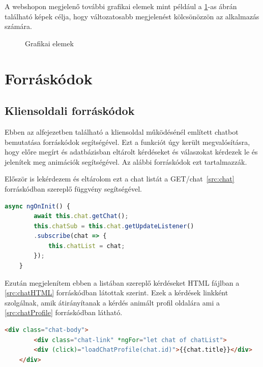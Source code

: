 A webshopon megjelenő további grafikai elemek mint például a \ref{fig.picture-13}-as ábrán található képek célja, hogy változatosabb megjelenést kölcsönözzön az alkalmazás számára.
\begin{figure}[H]
	\centering
	\hspace{5pt}
	\caption{Grafikai elemek}
	\label{fig.picture-13}
\end{figure}

\section{Forráskódok}

\subsection{Kliensoldali forráskódok}
Ebben az alfejezetben található a kliensoldal működésénél említett chatbot bemutatása forráskódok segítségével. Ezt a funkciót úgy került megvalósításra, hogy előre megírt és adatbázisban eltárolt kérdéseket és válaszokat kérdezek le és jelenítek meg animációk segítségével. Az alábbi forráskódok ezt tartalmazzák.

Először is lekérdezem és eltárolom ezt a chat listát a GET/chat~\ref{src:chat} forráskódban szereplő függvény  segítségével.

\begin{lstlisting}[language=JavaScript]
	async ngOnInit() {
		await this.chat.getChat();
		this.chatSub = this.chat.getUpdateListener()
		.subscribe(chat => {
			this.chatList = chat;
		});
	}
\end{lstlisting}

Ezután megjelenítem ebben a listában szereplő kérdéseket HTML fájlban a \ref{src:chatHTML} forráskódban látottak szerint. Ezek a kérdések linkként szolgálnak, amik átirányítanak a kérdés animált profil oldalára ami a \ref{src:chatProfile} forráskódban látható.
\begin{lstlisting}[language=html]
	 <div class="chat-body">
		<div class="chat-link" *ngFor="let chat of chatList">
		<div (click)="loadChatProfile(chat.id)">{{chat.title}}</div>
	</div>
\end{lstlisting}

